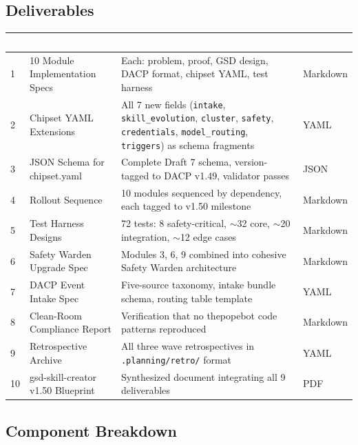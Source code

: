 \documentclass[11pt,letterpaper]{article}
\newcommand{\tableheader}[1]{\textbf{\sffamily\textcolor{white}{#1}}}
\begin{document}
\subsection{Deliverables}

\begin{center}
\begin{tabularx}{\textwidth}{C{0.5cm}L{4cm}XL{2cm}}
\toprule
{}
\tableheader{\#} & \tableheader{Deliverable} & \tableheader{Acceptance Criteria} & \tableheader{Format} \\
 & 10 Module Implementation Specs & Each: problem, proof, GSD design, DACP format, chipset YAML, test harness & Markdown \\
2 & Chipset YAML Extensions & All 7 new fields (\texttt{intake}, \texttt{skill\_evolution}, \texttt{cluster}, \texttt{safety}, \texttt{credentials}, \texttt{model\_routing}, \texttt{triggers}) as schema fragments & YAML \\
3 & JSON Schema for chipset.yaml & Complete Draft 7 schema, version-tagged to DACP v1.49, validator passes & JSON \\
4 & Rollout Sequence & 10 modules sequenced by dependency, each tagged to v1.50 milestone & Markdown \\
5 & Test Harness Designs & 72 tests: 8 safety-critical, $\sim$32 core, $\sim$20 integration, $\sim$12 edge cases & Markdown \\
6 & Safety Warden Upgrade Spec & Modules 3, 6, 9 combined into cohesive Safety Warden architecture & Markdown \\
7 & DACP Event Intake Spec & Five-source taxonomy, intake bundle schema, routing table template & YAML \\
8 & Clean-Room Compliance Report & Verification that no thepopebot code patterns reproduced & Markdown \\
9 & Retrospective Archive & All three wave retrospectives in \texttt{.planning/retro/} format & YAML \\
10 & gsd-skill-creator v1.50 Blueprint & Synthesized document integrating all 9 deliverables & PDF \\
\end{tabularx}
\end{center}

\subsection{Component Breakdown}
\end{document}
